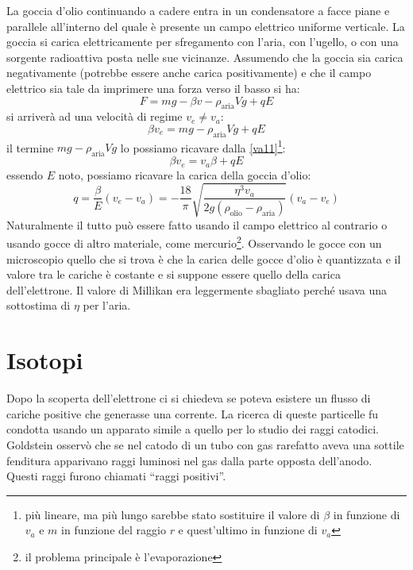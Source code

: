 La goccia d'olio continuando a cadere entra in un condensatore a facce piane e parallele all'interno del quale è presente un campo elettrico uniforme verticale. La goccia si carica elettricamente per sfregamento con l'aria, con l'ugello, o con una sorgente radioattiva posta nelle sue vicinanze. Assumendo che la goccia sia carica negativamente (potrebbe essere anche carica positivamente) e che il campo elettrico sia tale da imprimere una forza verso il basso si ha:
\begin{equation}
F=mg-\beta v-\rho_\text{aria}Vg+qE
\end{equation}
si arriverà ad una velocità di regime $v_e\neq v_a$:
\begin{equation}
\beta v_e=mg-\rho_\text{aria}Vg+qE
\end{equation}
il termine $mg-\rho_\text{aria}Vg$ lo possiamo ricavare dalla \eqref{va11}\footnote{più lineare, ma più lungo sarebbe stato sostituire il valore di $\beta$ in funzione di $v_a$ e $m$ in funzione del raggio $r$ e quest'ultimo in funzione di $v_a$}:
\begin{equation}
\beta v_e=v_a\beta+qE
\end{equation}
essendo $E$ noto, possiamo ricavare la carica della goccia d'olio:
\begin{equation}
q=\frac{\beta}{E}(v_e-v_a)=-\frac{18}{\pi}\sqrt{\frac{\eta^3v_a}{2g\left(\rho_\text{olio}-\rho_\text{aria}\right)}}\left(v_a-v_e\right)
\end{equation}
Naturalmente il tutto può essere fatto usando il campo elettrico al contrario o usando gocce di altro materiale, come mercurio\footnote{il problema principale è l'evaporazione}. Osservando le gocce con un microscopio quello che si trova è che la carica delle gocce d'olio è quantizzata e il valore tra le cariche è costante e si suppone essere quello della carica dell'elettrone. Il valore di Millikan era leggermente sbagliato perché usava una sottostima di $\eta$ per l'aria.

\section{Isotopi}
Dopo la scoperta dell'elettrone ci si chiedeva se poteva esistere un flusso di cariche positive che generasse una corrente. La ricerca di queste particelle fu condotta usando un apparato simile a quello per lo studio dei raggi catodici. Goldstein osservò che se nel catodo di un tubo con gas rarefatto aveva una sottile fenditura apparivano raggi luminosi nel gas dalla parte opposta dell'anodo. Questi raggi furono chiamati ``raggi positivi''.

